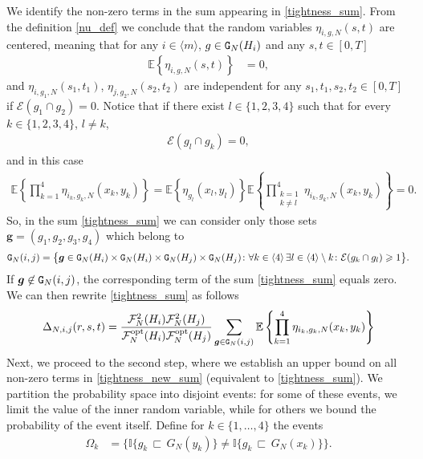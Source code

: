 \documentclass[11pt,reqno]{amsart}
\numberwithin{equation}{section}
\newcommand{\sprod}[1]{\langle#1\rangle}
\newcommand{\E}[1]{\mathbb{E}\left\{ #1\right\}}
\newcommand{\kb}[1]{\boldsymbol{#1}}
\newcommand{\vk}[1]{\kb{#1}}
\begin{document}
{We identify the non-zero terms in the sum appearing in \eqref{tightness_sum}.} From the definition \eqref{nu_def} we conclude that the random variables $\eta_{i,g,N}(s,t)$ are centered, meaning that for any $i\in\sprod{m}$, $g\in{\tt G}_N({H}_i)$ and any $s,t\in[0,T]$
\begin{align*}
    \E{\eta_{i,g,N}(s,t)} &= 0,
\end{align*}
and $\eta_{i,g_1,N}(s_1,t_1)$, $\eta_{j,g_2,N}(s_2,t_2)$ are independent for any $s_1,t_1,s_2,t_2\in[0,T]$ if $\mathcal{E}(g_1\cap g_2) =0$.
Notice that if there exist $l\in\{1,2,3,4\}$ such that for every $k\in\{1,2,3,4\}$, ${l}\not= k$,
\begin{align*}
    \mathcal{E}(g_{{l}}\cap g_k) = 0,
\end{align*}
and in this case
\begin{align*}
    \E{\prod_{k=1}^{4}\eta_{i_k,g_k,N}(x_k,y_k)} = \E{\eta_{g_l}(x_l,y_l)}\E{\prod_{\substack{k=1 \\ k\not= l}}^{4}\eta_{i_k,g_k,N}(x_k,y_k)} = 0.
\end{align*}
So, in the sum \eqref{tightness_sum} we can consider only those sets $\vk g = (g_1,g_2,g_3,g_4)$ which belong to 
\begin{align}
    {\tt G}_{N}(i,j) = 
   \bigl\{\vk g\in {{\tt G}_N(H_i)\times{\tt G}_N(H_i)\times{\tt G}_N(H_j)\times{\tt G}_N(H_j)}\colon \forall k\in\sprod{4}\, \exists l\in\sprod{4}\setminus k\colon \mathcal{E}({g_k\cap g_l})\geqslant 1\bigr\}.
    \label{tightness_g_condition}
\end{align}
If $\vk g\not\in{\tt G}_{N}(i,j)$, the corresponding term of the sum \eqref{tightness_sum} equals zero.
We can then rewrite \eqref{tightness_sum} as follows
\begin{align}
    \Delta_{N,i,j}(r,s,t) = \frac{\mathcal{F}_N^2({H}_i)\mathcal{F}_N^2({H}_j)}{\mathcal{F}^{\rm opt}_N({H}_i)\mathcal{F}^{\rm opt}_N({H}_j)}\sum_{\vk g\in{{\tt G}_{N}(i,j)}} \E{\prod_{k=1}^{4}\eta_{i_k,g_k,N}(x_k,y_k)}\label{tightness_new_sum}
\end{align}
{Next, we proceed to the second step, where we establish an upper bound on all non-zero terms in \eqref{tightness_new_sum} (equivalent to \eqref{tightness_sum}). We partition the probability space into disjoint events: for some of these events, we limit the value of the inner random variable, while for others we bound the probability of the event itself.} Define for $k\in\{1,\ldots,4\}$ the events
\begin{align}
    \Omega_k &= \bigl\{\mathbb{I}\{g_{k}{\,\sqsubset\,} G_N(y_k)\} \not= \mathbb{I}\{g_{k}{\,\sqsubset\,} G_N(x_k)\}\bigr\}.\label{Omega_def}
\end{align}
\end{document}
